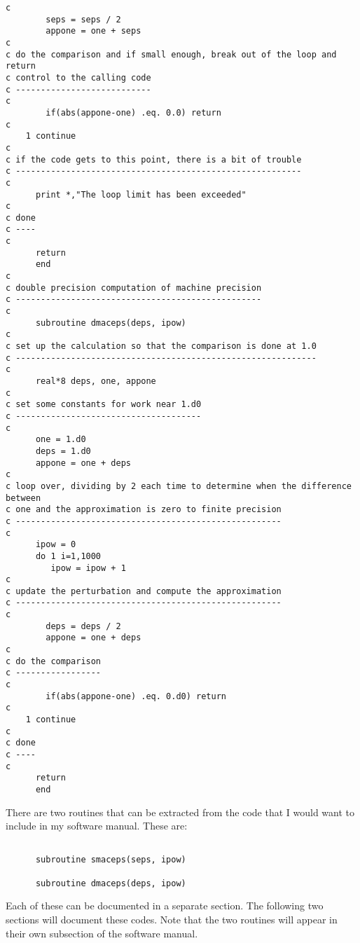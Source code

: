 \begin{verbatim}
c
        seps = seps / 2
        appone = one + seps
c
c do the comparison and if small enough, break out of the loop and return
c control to the calling code
c ---------------------------
c
        if(abs(appone-one) .eq. 0.0) return
c
    1 continue
c
c if the code gets to this point, there is a bit of trouble
c ---------------------------------------------------------
c
      print *,"The loop limit has been exceeded"
c
c done
c ----
c
      return
      end
c
c double precision computation of machine precision
c -------------------------------------------------
c
      subroutine dmaceps(deps, ipow)
c
c set up the calculation so that the comparison is done at 1.0
c ------------------------------------------------------------
c
      real*8 deps, one, appone
c
c set some constants for work near 1.d0
c -------------------------------------
c
      one = 1.d0
      deps = 1.d0
      appone = one + deps
c
c loop over, dividing by 2 each time to determine when the difference between
c one and the approximation is zero to finite precision
c -----------------------------------------------------
c
      ipow = 0
      do 1 i=1,1000
         ipow = ipow + 1
c
c update the perturbation and compute the approximation
c -----------------------------------------------------
c
        deps = deps / 2
        appone = one + deps
c
c do the comparison
c -----------------
c
        if(abs(appone-one) .eq. 0.d0) return
c
    1 continue
c
c done
c ----
c
      return
      end

\end{verbatim}

There are two routines that can be extracted from the code that I would want to
include in my software manual. These are:

\begin{verbatim}

      subroutine smaceps(seps, ipow)

      subroutine dmaceps(deps, ipow)

\end{verbatim}

Each of these can be documented in a separate section. The following two
sections will document these codes. Note that the two routines will appear in
their own subsection of the software manual.

\newpage
